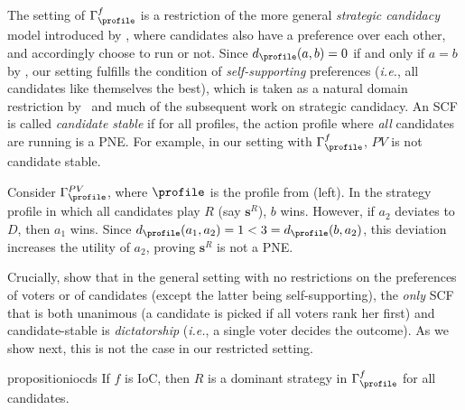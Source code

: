 The setting of $\Gamma^f_{\profile}$ is a restriction of the more general \emph{strategic candidacy} model introduced by \citet{Dutta01:Strategic}, where candidates also have a preference over each other, and accordingly choose to run or not. Since $d_{\profile}(a,b)=0$ if and only if $a=b$ by , our setting fulfills the condition of \emph{self-supporting} preferences (\emph{i.e.}, all candidates like themselves the best), which is taken as a natural domain restriction by \citeauthor{Dutta01:Strategic}~and much of the subsequent work on strategic candidacy. An SCF is called \emph{candidate stable} if for all profiles, the action profile where \emph{all} candidates are running is a PNE. For example, in our setting with  $\Gamma^f_{\profile}$, $PV$ is not candidate stable.

\begin{example}
    Consider $\Gamma^{PV}_{\profile}$, where $\profile$ is the profile from  (left). In the strategy profile in which all candidates play $R$ (say $\boldsymbol{s}^R$), $b$ wins. However, if $a_2$ deviates to $D$, then $a_1$ wins. Since $d_{\profile}(a_1,a_2)=1<3=d_{\profile}(b,a_2)$, this deviation increases the utility of $a_2$, proving $\boldsymbol{s}^R$ is not a PNE.
\end{example}

Crucially, \citet{Dutta01:Strategic} show that in the general setting with no restrictions on the preferences of voters or of candidates (except the latter being self-supporting), the \emph{only} SCF that is both unanimous (a candidate is picked if all voters rank her first) and candidate-stable is \emph{dictatorship} (\emph{i.e.}, a single voter decides the outcome). As we show next, this is not the case in our restricted setting.

\begin{restatable}{proposition}{iocds}\label{prop:ioc_ds}
    If $f$ is IoC, then $R$ is a dominant strategy in $\Gamma^f_{\profile}$ for all candidates. 
\end{restatable}

